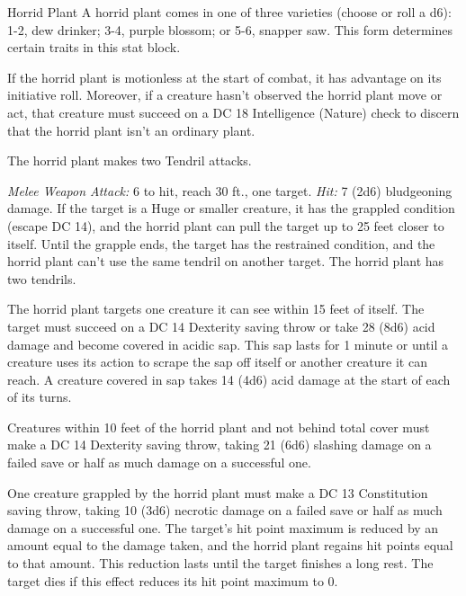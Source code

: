 \documentclass[10pt,a4paper,twoside,bg=print,twocolumn,openany,nodeprecatedcode]{dndbook}
\begin{document}
\begin{DndMonster}[float=t]{Horrid Plant}
\DndMonsterBasics[
armor-class = {6},
hit-points = {\DndDice{5d10 + 15}},
speed = {5 ft.}
]
\DndMonsterAbilityScores[
 str = 18,
 dex = 3,
 con = 17,
 int = 1,
 wis = 10,
 cha = 1
]
\DndMonsterDetails[
condition-immunities = {blinded, deafened},
senses = {blindsight 60 ft. (can't see beyond this radius), passive perception 10},
challenge = 4,
]
A horrid plant comes in one of three varieties (choose or roll a d6): 1-2, dew drinker; 3-4, purple blossom; or 5-6, snapper saw. This form determines certain traits in this stat block.

If the horrid plant is motionless at the start of combat, it has advantage on its initiative roll. Moreover, if a creature hasn't observed the horrid plant move or act, that creature must succeed on a DC 18 Intelligence (Nature) check to discern that the horrid plant isn't an ordinary plant.

The horrid plant makes two Tendril attacks.

\textsl{Melee Weapon Attack:} 6 to hit, reach 30 ft., one target. \textsl{Hit:} 7 (2d6) bludgeoning damage. If the target is a Huge or smaller creature, it has the grappled condition (escape DC 14), and the horrid plant can pull the target up to 25 feet closer to itself. Until the grapple ends, the target has the restrained condition, and the horrid plant can't use the same tendril on another target. The horrid plant has two tendrils.

The horrid plant targets one creature it can see within 15 feet of itself. The target must succeed on a DC 14 Dexterity saving throw or take 28 (8d6) acid damage and become covered in acidic sap. This sap lasts for 1 minute or until a creature uses its action to scrape the sap off itself or another creature it can reach. A creature covered in sap takes 14 (4d6) acid damage at the start of each of its turns.

Creatures within 10 feet of the horrid plant and not behind total cover must make a DC 14 Dexterity saving throw, taking 21 (6d6) slashing damage on a failed save or half as much damage on a successful one.

One creature grappled by the horrid plant must make a DC 13 Constitution saving throw, taking 10 (3d6) necrotic damage on a failed save or half as much damage on a successful one. The target's hit point maximum is reduced by an amount equal to the damage taken, and the horrid plant regains hit points equal to that amount. This reduction lasts until the target finishes a long rest. The target dies if this effect reduces its hit point maximum to 0.

\end{DndMonster}
\end{document}

